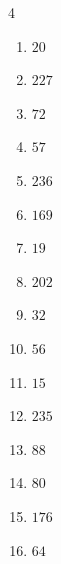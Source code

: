 \begin{multicols}{4}
\begin{enumerate}
  \item $20$


  \item $227$


  \item $72$


  \item $57$


  \item $236$


  \item $169$


  \item $19$


  \item $202$


  \item $32$


  \item $56$


\columnbreak %

  \item $15$


  \item $235$


  \item $88$


  \item $80$


  \item $176$


  \item $64$


\end{enumerate}
\end{multicols}
